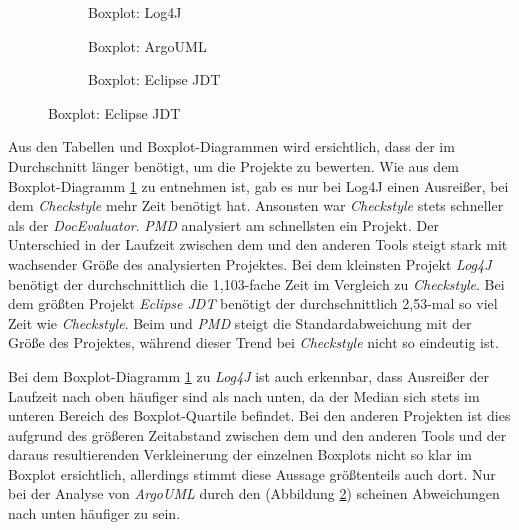  \begin{figure}
 \centering
    \begin{subfigure}[b]{0.49\textwidth}
    \centering

    \caption{Boxplot: Log4J}
    \label{fig:log4j_box}
\end{subfigure}
\hspace{0.01cm}
 \begin{subfigure}[b]{0.49\textwidth}
    \centering

    \caption{Boxplot: ArgoUML}
    \label{fig:argo_box}
\end{subfigure}

 \begin{subfigure}[b]{0.49\textwidth}
    \centering

    \caption{Boxplot: Eclipse \ac{JDT} }
    \label{fig:eclipse_box}
\end{subfigure}
   
 \end{figure}
 

Aus den Tabellen und Boxplot-Diagrammen wird ersichtlich, dass der \doceval im Durchschnitt länger benötigt, um die Projekte zu bewerten. Wie aus dem Boxplot-Diagramm \ref{fig:log4j_box} zu entnehmen ist, gab es nur bei Log4J einen Ausreißer, bei dem \textit{Checkstyle} mehr Zeit benötigt hat.   Ansonsten war \textit{Checkstyle} stets schneller als der \textit{DocEvaluator}. \textit{PMD} analysiert am schnellsten ein Projekt. Der Unterschied in der Laufzeit zwischen dem \doceval und den anderen Tools steigt stark  mit wachsender Größe des analysierten Projektes.  Bei dem kleinsten Projekt \textit{Log4J} benötigt der \doceval  durchschnittlich die 1,103-fache Zeit im Vergleich zu \textit{Checkstyle}. Bei dem größten Projekt \textit{Eclipse \ac{JDT}} benötigt der \doceval durchschnittlich 2,53-mal so viel Zeit wie \textit{Checkstyle}. Beim \doceval und \textit{PMD} steigt die Standardabweichung mit der Größe des Projektes, während dieser Trend bei \textit{Checkstyle} nicht so eindeutig ist.

Bei dem Boxplot-Diagramm \ref{fig:log4j_box} zu \textit{Log4J} ist auch erkennbar, dass Ausreißer der Laufzeit nach oben häufiger sind als nach unten, da der Median sich stets im unteren Bereich des Boxplot-Quartile befindet. Bei den anderen Projekten ist dies aufgrund des größeren Zeitabstand  zwischen dem \doceval und den anderen Tools  und der daraus resultierenden Verkleinerung der einzelnen Boxplots  nicht so klar im Boxplot ersichtlich, allerdings stimmt diese Aussage größtenteils auch dort. Nur bei der Analyse von \textit{ArgoUML} durch den \doceval (Abbildung \ref{fig:argo_box}) scheinen Abweichungen nach unten häufiger zu sein.

